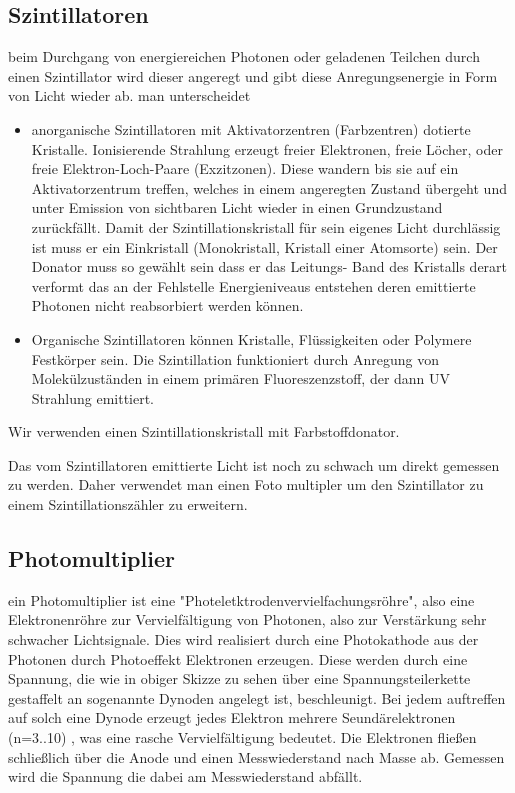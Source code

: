 \documentclass[12pt]{article}
\begin{document}
\subsection{Szintillatoren}
beim Durchgang von energiereichen Photonen oder geladenen Teilchen durch einen Szintillator wird dieser angeregt und gibt diese Anregungsenergie in Form von Licht wieder ab.
man unterscheidet
\begin{itemize}
 \item anorganische Szintillatoren
  mit Aktivatorzentren (Farbzentren) dotierte Kristalle. Ionisierende Strahlung erzeugt freier Elektronen, freie Löcher, oder freie Elektron-Loch-Paare (Exzitzonen).
  Diese wandern bis sie auf ein Aktivatorzentrum treffen, welches in einem angeregten Zustand übergeht und unter Emission von sichtbaren Licht wieder in einen Grundzustand 						zurückfällt. Damit der Szintillationskristall für sein eigenes Licht durchlässig ist muss er ein Einkristall (Monokristall, Kristall einer Atomsorte) sein. Der Donator muss so gewählt sein
  dass er das Leitungs- Band des Kristalls derart verformt das an der Fehlstelle Energieniveaus entstehen deren emittierte Photonen nicht reabsorbiert werden können.
 \item Organische Szintillatoren
  können Kristalle, Flüssigkeiten oder Polymere Festkörper sein. Die Szintillation funktioniert durch Anregung von Molekülzuständen in einem primären Fluoreszenzstoff, der 
  dann UV Strahlung emittiert.
\end{itemize}
Wir verwenden einen Szintillationskristall mit Farbstoffdonator.\newline

Das vom Szintillatoren emittierte Licht ist noch zu schwach um direkt gemessen zu werden. Daher verwendet man einen Foto multipler um den Szintillator zu einem Szintillationszähler zu erweitern.

\subsection{Photomultiplier}

ein Photomultiplier ist eine "Photeletktrodenvervielfachungsröhre", also eine Elektronenröhre zur Vervielfältigung von Photonen, also zur Verstärkung sehr schwacher Lichtsignale. Dies wird realisiert durch 
eine Photokathode aus der Photonen durch Photoeffekt Elektronen erzeugen. Diese werden durch eine Spannung, die wie in obiger Skizze zu sehen über eine Spannungsteilerkette gestaffelt an sogenannte Dynoden angelegt ist, beschleunigt. 
Bei jedem auftreffen auf solch eine Dynode erzeugt jedes Elektron mehrere Seundärelektronen (n=3..10) , was eine rasche Vervielfältigung bedeutet. Die Elektronen fließen schließlich über die Anode und einen Messwiederstand nach Masse ab. Gemessen wird die Spannung die dabei am Messwiederstand abfällt. \newline
\end{document}
